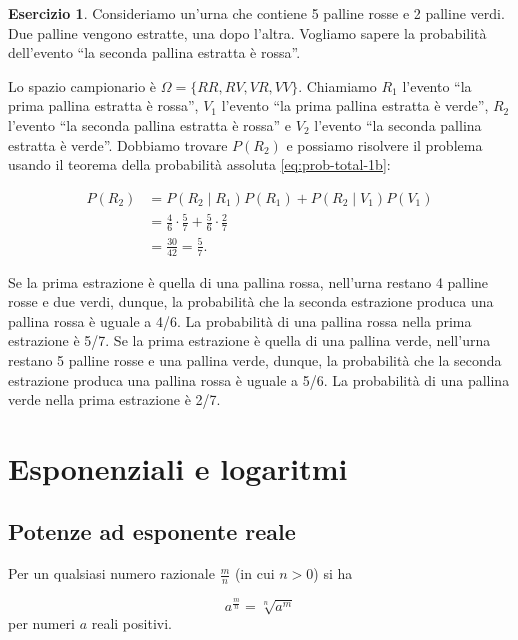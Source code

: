 \documentclass[
  11pt,
]{krantz}
\theoremstyle{definition}
\theoremstyle{definition}
\theoremstyle{definition}
\newtheorem{exercise}{Esercizio}[chapter]
\theoremstyle{definition}
\theoremstyle{remark}
\begin{document}
\begin{exercise}
Consideriamo un'urna che contiene 5 palline rosse e 2 palline verdi. Due palline vengono estratte, una dopo l'altra. Vogliamo sapere la probabilità dell'evento ``la seconda pallina estratta è rossa''.

Lo spazio campionario è \(\Omega = \{RR, RV, VR, VV\}\). Chiamiamo \(R_1\) l'evento ``la prima pallina estratta è rossa'', \(V_1\) l'evento ``la prima pallina estratta è verde'', \(R_2\) l'evento ``la seconda pallina estratta è rossa'' e \(V_2\) l'evento ``la seconda pallina estratta è verde''. Dobbiamo trovare \(P(R_2)\) e possiamo risolvere il problema usando il teorema della probabilità assoluta \eqref{eq:prob-total-1b}:

\[
\begin{split}
P(R_2) &= P(R_2 \mid R_1) P(R_1) + P(R_2 \mid V_1)P(V_1)\\
&= \frac{4}{6} \cdot \frac{5}{7} + \frac{5}{6} \cdot \frac{2}{7} \\
&= \frac{30}{42} = \frac{5}{7}.
\end{split}
\]

Se la prima estrazione è quella di una pallina rossa, nell'urna restano 4 palline rosse e due verdi, dunque, la probabilità che la seconda estrazione produca una pallina rossa è uguale a 4/6. La probabilità di una pallina rossa nella prima estrazione è 5/7. Se la prima estrazione è quella di una pallina verde, nell'urna restano 5 palline rosse e una pallina verde, dunque, la probabilità che la seconda estrazione produca una pallina rossa è uguale a 5/6. La probabilità di una pallina verde nella prima estrazione è 2/7.
\end{exercise}

\hypertarget{funs-exp-log}{%
\chapter{Esponenziali e logaritmi}\label{funs-exp-log}}

\hypertarget{potenze-ad-esponente-reale}{%
\section*{Potenze ad esponente reale}\label{potenze-ad-esponente-reale}}


Per un qualsiasi numero razionale \(\frac{m}{n}\) (in cui \(n > 0\)) si ha

\[
a^{\frac{m}{n}} = \sqrt[n]{a^m}
\] per numeri \(a\) reali positivi.
\end{document}
